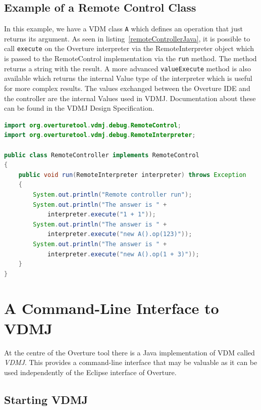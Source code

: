 \documentclass{overturerepchap}
\begin{document}
\section{Example of a Remote Control Class}

In this example, we have a VDM class \texttt{A} which defines an operation
that just returns its argument. As
seen in listing~\ref{remoteControllerJava}, it is possible to call
\texttt{execute} on the Overture interpreter via the RemoteInterpreter object
which is passed to the RemoteControl implementation via the \texttt{run} method.
The method returns a string with the result. A more
advanced \texttt{valueExecute} method is also available which returns the internal
Value type of the interpreter which is useful for more complex
results. The values exchanged between the Overture IDE and the 
controller are the internal Values used in VDMJ. Documentation about these
can be found in the VDMJ Design Specification\cite{Battle10}.

\begin{lstlisting}[language=JAVA,label=remoteControllerJava,caption=Remote Controller Java class,captionpos=b]
import org.overturetool.vdmj.debug.RemoteControl;
import org.overturetool.vdmj.debug.RemoteInterpreter;

public class RemoteController implements RemoteControl
{
	public void run(RemoteInterpreter interpreter) throws Exception
	{
		System.out.println("Remote controller run");
		System.out.println("The answer is " + 
			interpreter.execute("1 + 1")); 
		System.out.println("The answer is " + 
			interpreter.execute("new A().op(123)")); 
		System.out.println("The answer is " + 
			interpreter.execute("new A().op(1 + 3)")); 
	}
}
\end{lstlisting}

\chapter{A Command-Line Interface to VDMJ}\label{sec:commandline}

At the centre of the Overture tool there is a Java implementation of VDM
called \emph{VDMJ}. This provides a command-line interface that may be valuable
as it can be used independently of the Eclipse interface of Overture.

\section{Starting VDMJ}
\end{document}
